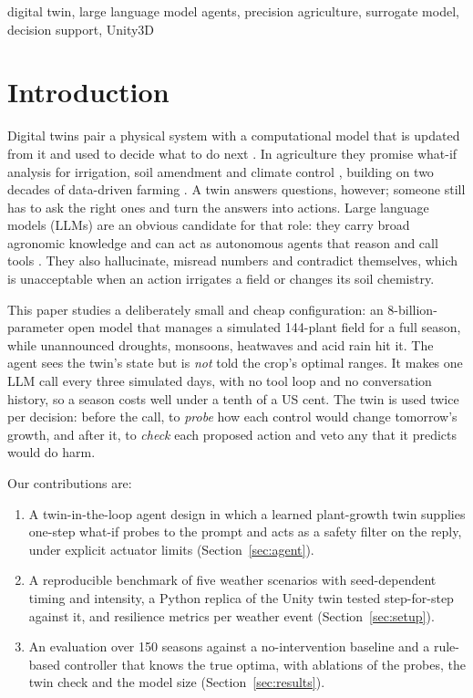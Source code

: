 \documentclass[conference]{IEEEtran}
\begin{document}
\begin{IEEEkeywords}
digital twin, large language model agents, precision agriculture, surrogate model, decision support, Unity3D
\end{IEEEkeywords}

\section{Introduction}

Digital twins pair a physical system with a computational model that is updated from it and
used to decide what to do next \cite{grieves2017digital}. In agriculture they promise
what-if analysis for irrigation, soil amendment and climate control
\cite{verdouw2021digital,pylianidis2021introducing}, building on two decades of data-driven
farming \cite{wolfert2017big,liakos2018machine}. A twin answers questions, however; someone
still has to ask the right ones and turn the answers into actions. Large language models
(LLMs) are an obvious candidate for that role: they carry broad agronomic knowledge
\cite{silva2023gpt4,tzachor2023large} and can act as autonomous agents that reason and call
tools \cite{yao2023react,schick2023toolformer,wang2024survey}. They also hallucinate, misread
numbers and contradict themselves, which is unacceptable when an action irrigates a field or
changes its soil chemistry.

This paper studies a deliberately small and cheap configuration: an 8-billion-parameter
open model \cite{grattafiori2024llama3} that manages a simulated 144-plant field for a full
season, while unannounced droughts, monsoons, heatwaves and acid rain hit it. The agent sees the
twin's state but is \emph{not} told the crop's optimal ranges. It makes one LLM call every three
simulated days, with no tool loop and no conversation history, so a season costs well under a
tenth of a US cent. The twin is used twice per decision: before the call, to \emph{probe} how
each control would change tomorrow's growth, and after it, to \emph{check} each proposed action
and veto any that it predicts would do harm.

Our contributions are:
\begin{enumerate}
\item A twin-in-the-loop agent design in which a learned plant-growth twin supplies
one-step what-if probes to the prompt and acts as a safety filter on the reply, under explicit
actuator limits (Section~\ref{sec:agent}).
\item A reproducible benchmark of five weather scenarios with seed-dependent timing and
intensity, a Python replica of the Unity twin tested step-for-step against it, and resilience
metrics per weather event (Section~\ref{sec:setup}).
\item An evaluation over 150 seasons against a no-intervention baseline and a rule-based
controller that knows the true optima, with ablations of the probes, the twin check and the
model size (Section~\ref{sec:results}).
\end{enumerate}
\end{document}
